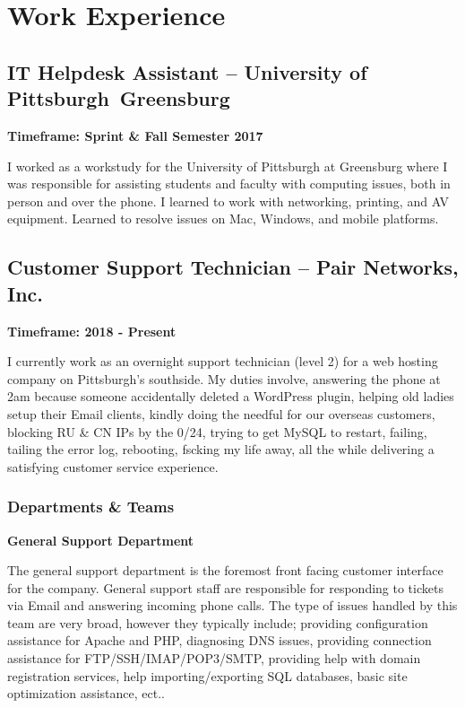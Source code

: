 \documentclass{article}
\begin{document}
\section{Work Experience}

\subsection{IT Helpdesk Assistant -- University of Pittsburgh Greensburg}

\textbf{Timeframe: Sprint \& Fall Semester 2017}

I worked as a workstudy for the University of Pittsburgh at Greensburg where I
was responsible for assisting students and faculty with computing issues, both
in person and over the phone. I learned to work with networking, printing, and
AV equipment. Learned to resolve issues on Mac, Windows, and mobile platforms.

\subsection{Customer Support Technician -- Pair Networks, Inc.}

\textbf{Timeframe: 2018 - Present}

I currently work as an overnight support technician (level 2) for a web hosting
company on Pittsburgh's southside. My duties involve, answering the phone at
2am because someone accidentally deleted a WordPress plugin, helping old ladies
setup their Email clients, kindly doing the needful for our overseas customers,
blocking RU \& CN IPs by the 0/24, trying to get MySQL to restart, failing,
tailing the error log, rebooting, fscking my life away, all the while
delivering a satisfying customer service experience.

\subsubsection{Departments \& Teams} 

\noindent
\textbf{General Support Department}

The general support department is the foremost front facing customer interface
for the company. General support staff are responsible for responding to
tickets via Email and answering incoming phone calls. The type of issues
handled by this team are very broad, however they typically include; providing
configuration assistance for Apache and PHP, diagnosing DNS issues, providing
connection assistance for FTP/SSH/IMAP/POP3/SMTP, providing help with domain
registration services, help importing/exporting SQL databases, basic site
optimization assistance, ect..
\end{document}
